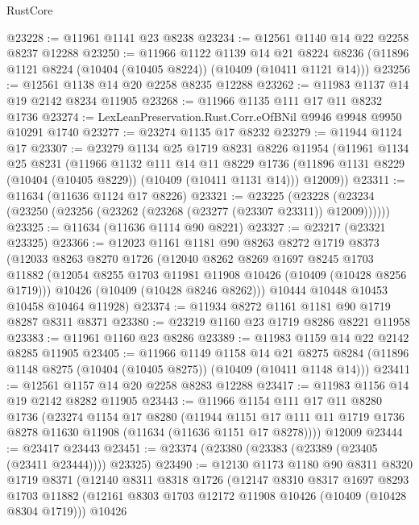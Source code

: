 \begin{lexlean}{RustCore}
\begin{coremodule}
@23228 := @11961 @1141 @23 @8238
@23234 := @12561 @1140 @14 @22 @2258 @8237 @12288
@23250 := @11966
    @1122
    @1139
    @14
    @21
    @8224
    @8236
    (@11896 @1121 @8224 (@10404 (@10405 @8224)) (@10409 (@10411 @1121 @14)))
@23256 := @12561 @1138 @14 @20 @2258 @8235 @12288
@23262 := @11983 @1137 @14 @19 @2142 @8234 @11905
@23268 := @11966 @1135 @111 @17 @11 @8232 @1736
@23274 := LexLeanPreservation.Rust.Corr.eOfBNil @9946 @9948 @9950 @10291 @1740
@23277 := @23274 @1135 @17 @8232
@23279 := @11944 @1124 @17
@23307 := @23279
    @1134
    @25
    @1719
    @8231
    @8226
    @11954
    (@11961
      @1134
      @25
      @8231
      (@11966
        @1132
        @111
        @14
        @11
        @8229
        @1736
        (@11896 @1131 @8229 (@10404 (@10405 @8229)) (@10409 (@10411 @1131 @14)))
        @12009))
@23311 := @11634 (@11636 @1124 @17 @8226)
@23321 := @23225
    (@23228 (@23234 (@23250 (@23256 (@23262 (@23268 (@23277 (@23307 @23311)) @12009))))))
@23325 := @11634 (@11636 @1114 @90 @8221)
@23327 := @23217 (@23321 @23325)
@23366 := @12023
    @1161
    @1181
    @90
    @8263
    @8272
    @1719
    @8373
    (@12033
      @8263
      @8270
      @1726
      (@12040
        @8262
        @8269
        @1697
        @8245
        @1703
        @11882
        (@12054 @8255 @1703 @11981 @11908 @10426 (@10409 (@10428 @8256 @1719)))
        @10426
        (@10409 (@10428 @8246 @8262)))
      @10444
      @10448
      @10453
      @10458
      @10464
      @11928)
@23374 := @11934 @8272 @1161 @1181 @90 @1719 @8287 @8311 @8371
@23380 := @23219 @1160 @23 @1719 @8286 @8221 @11958
@23383 := @11961 @1160 @23 @8286
@23389 := @11983 @1159 @14 @22 @2142 @8285 @11905
@23405 := @11966
    @1149
    @1158
    @14
    @21
    @8275
    @8284
    (@11896 @1148 @8275 (@10404 (@10405 @8275)) (@10409 (@10411 @1148 @14)))
@23411 := @12561 @1157 @14 @20 @2258 @8283 @12288
@23417 := @11983 @1156 @14 @19 @2142 @8282 @11905
@23443 := @11966
    @1154
    @111
    @17
    @11
    @8280
    @1736
    (@23274
      @1154
      @17
      @8280
      (@11944 @1151 @17 @111 @11 @1719 @1736 @8278 @11630 @11908 (@11634 (@11636 @1151 @17 @8278))))
    @12009
@23444 := @23417 @23443
@23451 := @23374 (@23380 (@23383 (@23389 (@23405 (@23411 @23444)))) @23325)
@23490 := @12130
    @1173
    @1180
    @90
    @8311
    @8320
    @1719
    @8371
    (@12140
      @8311
      @8318
      @1726
      (@12147
        @8310
        @8317
        @1697
        @8293
        @1703
        @11882
        (@12161 @8303 @1703 @12172 @11908 @10426 (@10409 (@10428 @8304 @1719)))
        @10426

\end{coremodule}
\end{lexlean}
